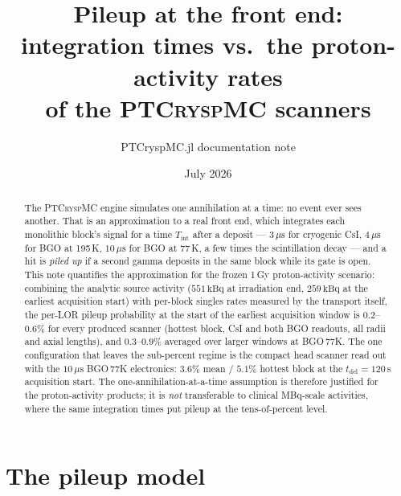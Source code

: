 \documentclass[11pt,a4paper]{article}
\title{Pileup at the front end:\\
       integration times vs.\ the proton-activity rates\\
       of the \textsc{PTCryspMC} scanners}
\author{PTCryspMC.jl documentation note}
\date{July 2026}
\newcommand{\us}{\,\mu\mathrm{s}}
\newcommand{\kBq}{\,\mathrm{kBq}}
\begin{document}
\maketitle

\begin{abstract}
\noindent
The \textsc{PTCryspMC} engine simulates one annihilation at a time: no event ever sees another.
That is an approximation to a real front end, which integrates each monolithic block's signal for
a time $T_{\mathrm{int}}$ after a deposit --- $3\us$ for cryogenic CsI, $4\us$ for BGO at 195\,K,
$10\us$ for BGO at 77\,K, a few times the scintillation decay --- and a hit is \emph{piled up} if
a second gamma deposits in the same block while its gate is open. This note quantifies the
approximation for the frozen 1\,Gy proton-activity scenario: combining the analytic source
activity ($551\kBq$ at irradiation end, $259\kBq$ at the earliest acquisition start) with
per-block singles rates measured by the transport itself, the per-LOR pileup probability at the
start of the earliest acquisition window is $0.2$--$0.6\%$ for every produced scanner (hottest
block, CsI and both BGO readouts, all radii and axial lengths), and $0.3$--$0.9\%$ averaged over
larger windows at BGO\,77K. The one configuration that leaves the sub-percent regime is the
compact head scanner read out with the $10\us$ BGO\,77K electronics: $3.6\%$ mean / $5.1\%$
hottest block at the $t_{\mathrm{del}}=120$\,s acquisition start. The one-annihilation-at-a-time
assumption is therefore justified for the proton-activity products; it is \emph{not} transferable
to clinical MBq-scale activities, where the same integration times put pileup at the tens-of-percent
level.
\end{abstract}

\section{The pileup model}
\label{sec:model}
\end{document}
